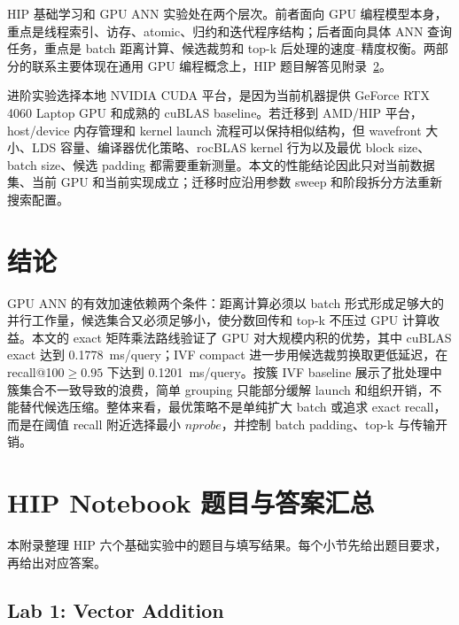 \documentclass[10pt,a4paper]{article}
\newcommand{\msq}{ms/query}
\begin{document}
HIP 基础学习和 GPU ANN 实验处在两个层次。前者面向 GPU 编程模型本身，重点是线程索引、访存、atomic、归约和迭代程序结构；后者面向具体 ANN 查询任务，重点是 batch 距离计算、候选裁剪和 top-k 后处理的速度--精度权衡。两部分的联系主要体现在通用 GPU 编程概念上，HIP 题目解答见附录~\ref{app:hip-answers}。

进阶实验选择本地 NVIDIA CUDA 平台，是因为当前机器提供 GeForce RTX 4060 Laptop GPU 和成熟的 cuBLAS baseline。若迁移到 AMD/HIP 平台，host/device 内存管理和 kernel launch 流程可以保持相似结构，但 wavefront 大小、LDS 容量、编译器优化策略、rocBLAS kernel 行为以及最优 block size、batch size、候选 padding 都需要重新测量。本文的性能结论因此只对当前数据集、当前 GPU 和当前实现成立；迁移时应沿用参数 sweep 和阶段拆分方法重新搜索配置。

\section{结论}

GPU ANN 的有效加速依赖两个条件：距离计算必须以 batch 形式形成足够大的并行工作量，候选集合又必须足够小，使分数回传和 top-k 不压过 GPU 计算收益。本文的 exact 矩阵乘法路线验证了 GPU 对大规模内积的优势，其中 cuBLAS exact 达到 0.1778~\msq{}；IVF compact 进一步用候选裁剪换取更低延迟，在 recall@100$\ge0.95$ 下达到 0.1201~\msq{}。按簇 IVF baseline 展示了批处理中簇集合不一致导致的浪费，简单 grouping 只能部分缓解 launch 和组织开销，不能替代候选压缩。整体来看，最优策略不是单纯扩大 batch 或追求 exact recall，而是在阈值 recall 附近选择最小 $nprobe$，并控制 batch padding、top-k 与传输开销。



\clearpage
\appendix

\section{HIP Notebook 题目与答案汇总}
\label{app:hip-answers}

本附录整理 HIP 六个基础实验中的题目与填写结果。每个小节先给出题目要求，再给出对应答案。

\subsection{Lab 1: Vector Addition}
\end{document}
